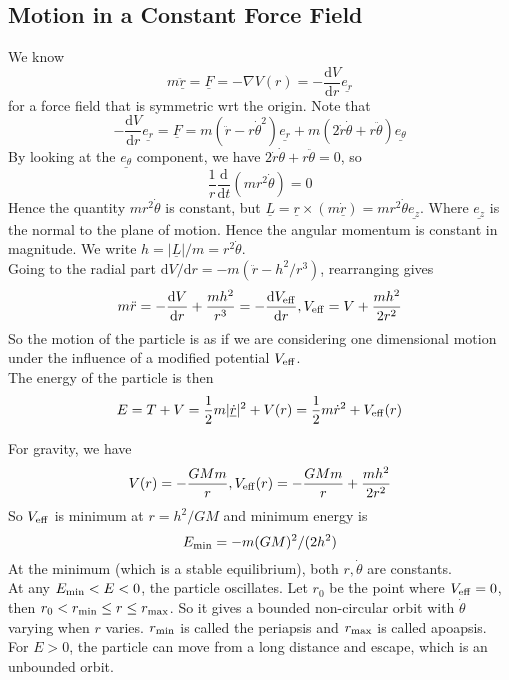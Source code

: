 \subsection{Motion in a Constant Force Field}
We know
$$m\underline{\ddot{r}}=\underline{F}=-\nabla V(r)=-\frac{\mathrm dV}{\mathrm dr}\underline{e_r}$$
for a force field that is symmetric wrt the origin.
Note that
$$-\frac{\mathrm dV}{\mathrm dr}\underline{e_r}=\underline{F}=m(\ddot{r}-r\dot{\theta}^2)\underline{e_r}+m(2\dot{r}\dot{\theta}+r\ddot{\theta})\underline{e_\theta}$$
By looking at the $\underline{e_\theta}$ component, we have $2\dot{r}\dot{\theta}+r\ddot{\theta}=0$, so
$$\frac{1}{r}\frac{\mathrm d}{\mathrm dt}(mr^2\dot{\theta})=0$$
Hence the quantity $mr^2\dot{\theta}$ is constant, but $\underline{L}=\underline{r}\times (m\underline{\dot{r}})=mr^2\dot{\theta}\underline{e_z}$.
Where $\underline{e_z}$ is the normal to the plane of motion.
Hence the angular momentum is constant in magnitude.
We write $h=|\underline{L}|/m=r^2\dot{\theta}$.\\
Going to the radial part $\mathrm dV/\mathrm dr=-m(\ddot{r}-h^2/r^3)$, rearranging gives
$$m\ddot{r}=-\frac{\mathrm dV}{\mathrm dr}+\frac{mh^2}{r^3}=-\frac{\mathrm dV_{\rm eff}}{\mathrm dr},V_{\rm eff}=V+\frac{mh^2}{2r^2}$$
So the motion of the particle is as if we are considering one dimensional motion under the influence of a modified potential $V_{\rm eff}$.\\
The energy of the particle is then
$$E=T+V=\frac{1}{2}m|\underline{\dot{r}}|^2+V(r)=\frac{1}{2}m\dot{r}^2+V_{\rm eff}(r)$$
\begin{example}
    For gravity, we have
    $$V(r)=-\frac{GMm}{r},V_{\rm eff}(r)=-\frac{GMm}{r}+\frac{mh^2}{2r^2}$$
    So $V_{\rm eff}$ is minimum at $r=h^2/GM$ and minimum energy is
    $$E_{\rm min}=-m(GM)^2/(2h^2)$$
    At the minimum (which is a stable equilibrium), both $r,\dot\theta$ are constants.\\
    At any $E_{\rm min}<E<0$, the particle oscillates.
    Let $r_0$ be the point where $V_{\rm eff}=0$, then $r_0<r_{\rm min}\le r\le r_{\rm max}$.
    So it gives a bounded non-circular orbit with $\dot\theta$ varying when $r$ varies.
    $r_{\rm min}$ is called the periapsis and $r_{\rm max}$ is called apoapsis.\\
    For $E>0$, the particle can move from a long distance and escape, which is an unbounded orbit.
\end{example}
